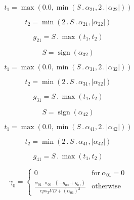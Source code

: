 \documentclass{article}
\begin{document}
\begin{dmath}t_{1} = \max\left(0.0, \min\left(S \,.\, \alpha_{21}, 2 \,.\, \left|{\alpha_{22}}\right|\right)\right)\end{dmath}

\begin{dmath}t_{2} = \min\left(2 \,.\, S \,.\, \alpha_{21}, \left|{\alpha_{22}}\right|\right)\end{dmath}

\begin{dmath}g_{21} = S \,.\, \max\left(t_{1}, t_{2}\right)\end{dmath}

\begin{dmath}S = \operatorname{sign}{\left (\alpha_{32} \right )}\end{dmath}

\begin{dmath}t_{1} = \max\left(0.0, \min\left(S \,.\, \alpha_{31}, 2 \,.\, \left|{\alpha_{32}}\right|\right)\right)\end{dmath}

\begin{dmath}t_{2} = \min\left(2 \,.\, S \,.\, \alpha_{31}, \left|{\alpha_{32}}\right|\right)\end{dmath}

\begin{dmath}g_{31} = S \,.\, \max\left(t_{1}, t_{2}\right)\end{dmath}

\begin{dmath}S = \operatorname{sign}{\left (\alpha_{42} \right )}\end{dmath}

\begin{dmath}t_{1} = \max\left(0.0, \min\left(S \,.\, \alpha_{41}, 2 \,.\, \left|{\alpha_{42}}\right|\right)\right)\end{dmath}

\begin{dmath}t_{2} = \min\left(2 \,.\, S \,.\, \alpha_{41}, \left|{\alpha_{42}}\right|\right)\end{dmath}

\begin{dmath}g_{41} = S \,.\, \max\left(t_{1}, t_{2}\right)\end{dmath}

\begin{dmath}\gamma_{0} = \begin{cases} 0 & \text{for}\: \alpha_{01} = 0 \\\frac{\alpha_{01} \,.\, \sigma_{0 0} \,.\, \left(- g_{00} + g_{01}\right)}{eps_TVD + \left(\alpha_{01} \right)^{2}} & \text{otherwise} \end{cases}\end{dmath}
\end{document}
